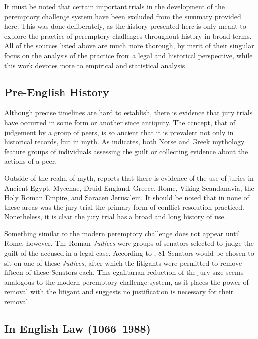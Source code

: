 It must be noted that certain important trials in the development of the peremptory challenge system have been excluded from the
summary provided here. This was done deliberately, as the history presented here is only meant to explore the practice of
peremptory challenges throughout history in broad terms. All of the sources listed above are much more thorough, by merit of their
singular focus on the analysis of the practice from a legal and historical perspective, while this work devotes more to empirical
and statistical analysis.

\subsection{Pre-English History}

Although precise timelines are hard to establish, there is evidence that jury trials have occurred in some form or another since
antiquity. The concept, that of judgement by a group of peers, is so ancient that it is prevalent not only in historical records,
but in myth. As \cite{hoffman1997} indicates, both Norse and Greek mythology feature groups of individuals assessing the guilt or
collecting evidence about the actions of a peer.

Outside of the realm of myth, \cite{hoffman1997} reports that there is evidence of the use of juries in Ancient Egypt, Mycenae,
Druid England, Greece, Rome, Viking Scandanavia, the Holy Roman Empire, and Saracen Jerusalem. It should be noted that in none of
these areas was the jury trial the primary form of conflict resolution practiced. Nonetheless, it is clear the jury trial has a
broad and long history of use.

Something similar to the modern peremptory challenge does not appear until Rome, however. The Roman \textit{Judices} were groups
of senators selected to judge the guilt of the accused in a legal case. According to \cite{hoffman1997}, 81 Senators would be
chosen to sit on one of these \textit{Judices}, after which the litigants were permitted to remove fifteen of these Senators
each. This egalitarian reduction of the jury size seems analogous to the modern peremptory challenge system, as it places the
power of removal with the litigant and suggests no justification is necessary for their removal.

\subsection{In English Law (1066--1988)}

